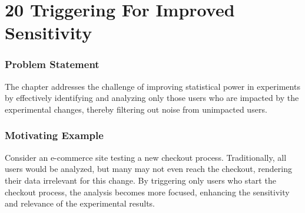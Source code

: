 \documentclass{article}
\begin{document}
\section*{20 Triggering For Improved Sensitivity}
\subsubsection*{Problem Statement}
The chapter addresses the challenge of improving statistical power in experiments by effectively identifying and analyzing only those users who are impacted by the experimental changes, thereby filtering out noise from unimpacted users.

\subsubsection*{Motivating Example}
Consider an e-commerce site testing a new checkout process. Traditionally, all users would be analyzed, but many may not even reach the checkout, rendering their data irrelevant for this change. By triggering only users who start the checkout process, the analysis becomes more focused, enhancing the sensitivity and relevance of the experimental results.
\end{document}
